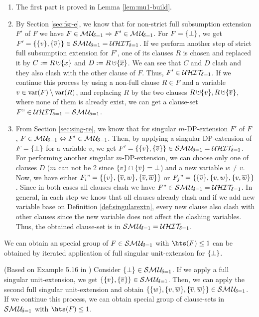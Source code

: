 \documentclass{report}
\begin{document}
\begin{prf}
  \begin{enumerate}
  \item The first part is proved in Lemma \ref{lem:mu1-build}.          
  \item By Section \ref{sec:fsr-e}, we know that for non-strict full subsumption extension $F'$ of $F$ we have $F \in  \mathcal{M\hspace{0.8pt}U}_{\!\delta=1} \Rightarrow F' \in \mathcal{M\hspace{0.8pt}U}_{\!\delta=1}$. For  $F=\{ \bot \}$, we get $F'=\{ \{ v \},\{ \overline v \} \} \in \mathcal{S}\mathcal{M\hspace{0.8pt}U}_{\!\delta=1} = \mathcal{U}\mathcal{HIT}_{\!\!\delta=1}$. If we perform another step of strict full subsumption extension for $F'$, one of its clauses $R$ is chosen and replaced it by $C := R \addcup \set{x}$ and $D := R \addcup \set{\ol{x}}$. We can see that $C$ and $D$ clash and  they also clash with the other clause of $F$. Thus, $F' \in \mathcal{U}\mathcal{HIT}_{\!\!\delta=1}$. If we continue this process by using a non-full clause $R \in F$ and a variable $v \in \operatorname{var}(F) \setminus \operatorname{var}(R)$, and replacing $R$ by the two clauses $R \addcup \set{v}, R \addcup \set{\ol{v}}$, where none of them is already exist, we can get a clause-set $F" \in \mathcal{U}\mathcal{HIT}_{\!\!\delta=1}=\mathcal{S}\mathcal{M\hspace{0.8pt}U}_{\!\delta=1}$.    
  \item From Section \ref{sec:sing-re}, we know that for singular $m$-DP-extension $F'$ of $F$ , $F \in \mathcal{M\hspace{0.8pt}U}_{\!\delta=1} \Leftrightarrow F' \in \mathcal{M\hspace{0.8pt}U}_{\!\delta=1}$. Then, by applying a singular DP-extension of $F=\{ \bot \}$ for a variable $v$, we get $F'=\{ \{ v \},\{ \overline v \} \} \in \mathcal{S}\mathcal{M\hspace{0.8pt}U}_{\!\delta=1} = \mathcal{U}\mathcal{HIT}_{\!\!\delta=1}$. For performing another  singular $m$-DP-extension, we can choose only one of clauses $D$ ($m$ can not be 2 since $\{ v \} \cap \{ \overline v \}=\bot $) and a new variable $w \not = v$. Now, we have either $F_i"=\{ \{ v \},\{ \overline v, w \},\{ \overline v,\overline w \} \}$ or $F_j"=\{ \{ \overline v \},\{  v, w \},\{  v,\overline w \} \}$. Since in both cases all clauses clash we have $F" \in \mathcal{S}\mathcal{M\hspace{0.8pt}U}_{\!\delta=1} = \mathcal{U}\mathcal{HIT}_{\!\!\delta=1}$. In general, in each step we know that all clauses already clash and if we add new variable base on Definition \ref{def:singularextn}, every new clause also clash with other clauses since the new variable does not affect the clashing variables. Thus, the obtained clause-set is in $\mathcal{S}\mathcal{M\hspace{0.8pt}U}_{\!\delta=1} = \mathcal{U}\mathcal{HIT}_{\!\!\delta=1}$.
  \end{enumerate}
\end{prf}

\begin{lem}\label{lem:mu1-strc}
We can obtain an special group of $F \in \mathcal{S}\mathcal{M\hspace{0.8pt}U}_{\!\delta=1}$ with $\hts(F) \le 1$ can be obtained by iterated application of full singular unit-extension for $\{ \bot \}$.
\end{lem}
\begin{prf}
(Based on Example 5.16 in \cite{h9}) Consider $\{ \bot \} \in \mathcal{S}\mathcal{M\hspace{0.8pt}U}_{\!\delta=1}$. If we apply a full singular unit-extension, we get $\{ \{ v \},\{ \overline{v} \} \} \in \mathcal{S}\mathcal{M\hspace{0.8pt}U}_{\!\delta=1}$. Then, we can apply the second full singular unit-extension and obtain $\{ \{ w \},\{ v,\overline{w} \},\{ \overline{v},\overline{w} \} \}\in \mathcal{S}\mathcal{M\hspace{0.8pt}U}_{\!\delta=1}$. If we continue this process, we can obtain special group of clause-sets in $\mathcal{S}\mathcal{M\hspace{0.8pt}U}_{\!\delta=1}$ with $\hts(F) \le 1$.
\end{prf}
\end{document}
